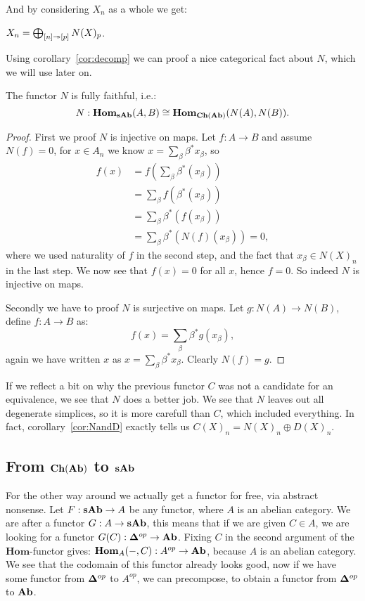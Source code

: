 And by considering $X_n$ as a whole we get:

\begin{corollary}
	$X_n = \bigoplus_{[n] \twoheadrightarrow [p]} N(X)_p$.
\end{corollary}

Using corollary~\ref{cor:decomp} we can proof a nice categorical fact about $N$, which we will use later on.
\begin{lemma}
	The functor $N$ is fully faithful, i.e.:
	$$ N : \mathbf{Hom}_{\mathbf{sAb}}(A, B) \cong \mathbf{Hom}_{\mathbf{Ch}(\mathbf{Ab})}(N(A), N(B)). $$
\end{lemma}
\begin{proof}
	First we proof $N$ is injective on maps. Let $f: A \to B$ and assume $N(f) = 0$, for $x \in A_n$ we know $x = \sum_\beta \beta^\ast x_\beta$, so
	\begin{align*}
		f(x) &= \textstyle f(\sum_\beta \beta^\ast (x_\beta)) \\
			&= \textstyle \sum_\beta f(\beta^\ast (x_\beta)) \\ 
			&= \textstyle \sum_\beta \beta^\ast (f (x_\beta)) \\ 
			&= \textstyle \sum_\beta \beta^\ast (N(f) (x_\beta)) = 0,	
	\end{align*}
	where we used naturality of $f$ in the second step, and the fact that $x_\beta \in N(X)_n$ in the last step. We now see that $f(x) = 0$ for all $x$, hence $f = 0$. So indeed $N$ is injective on maps.

	Secondly we have to proof $N$ is surjective on maps. Let $g : N(A) \to N(B)$, define $f : A \to B$ as:
	$$ f(x) = \sum_\beta \beta^\ast g(x_\beta), $$
	again we have written $x$ as $x = \sum_\beta \beta^\ast x_\beta$. Clearly $N(f) = g$. 
\end{proof}

If we reflect a bit on why the previous functor $C$ was not a candidate for an equivalence, we see that $N$ does a better job. We see that $N$ leaves out all degenerate simplices, so it is more carefull than $C$, which included everything. In fact, corollary~\ref{cor:NandD} exactly tells us $C(X)_n = N(X)_n \oplus D(X)_n$.

\subsection{From $\mathbf{Ch}(\mathbf{Ab})$ to $\mathbf{sAb}$}
For the other way around we actually get a functor for free, via abstract nonsense. Let $F : \mathbf{sAb} \to A$ be any functor, where $A$ is an abelian category. We are after a functor $G : A \to \mathbf{sAb}$, this means that if we are given $C \in A$, we are looking for a functor $G(C) : \mathbf{\Delta}^{op} \to \mathbf{Ab}$. Fixing $C$ in the second argument of the $\mathbf{Hom}$-functor gives: $\mathbf{Hom}_{A}(-, C) : A^{op} \to \mathbf{Ab}$, because $A$ is an abelian category. We see that the codomain of this functor already looks good, now if we have some functor from $\mathbf{\Delta}^{op}$ to $A^{op}$, we can precompose, to obtain a functor from $\mathbf{\Delta}^{op}$ to $\mathbf{Ab}$.

